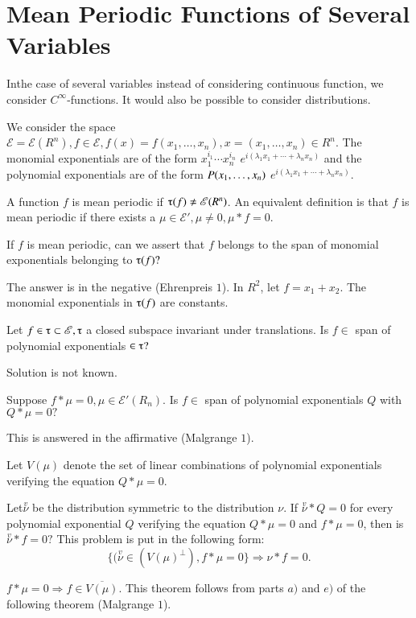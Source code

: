 \chapter{Mean Periodic Functions of Several Variables}\label{chap23}%

In\pageoriginale the case of several variables instead of considering continuous
function, we consider $C^\infty$-functions. It would also be possible
to consider distributions. 

We consider the space $\mathscr{E} = \mathscr{E}(R^n), f \in
\mathscr{E}, f(x) = f(x_1,\ldots, x_n), x = (x_1,\ldots, x_n) \in
R^n$. The monomial exponentials are of the form $x_1^{i_1} \cdots
x_n^{i_n}$ $e^{i (\lambda_1 x_1 + \cdots + \lambda_n x_n)}$ and the
polynomial exponentials are of the form $P(x_1,\ldots,\break x_n)$ 
$e^{i(\lambda_1x_1 + \cdots + \lambda_n x_n)}$. 

A function $f$ is mean periodic if $\tauup(f) \neq
\mathscr{E}(R^n)$. An equivalent definition is that $f$ is mean
periodic if there exists a $\mu \in \mathscr{E}', \mu \neq 0, \mu * f
= 0$. 

\begin{prob}\label{chap23:prob1}%
 If $f$ is mean periodic, can we assert that $f$ belongs to the span
 of monomial exponentials belonging to $\tauup (f)?$ 
\end{prob}

The answer is in the negative (Ehrenpreis $1$). In $R^2$, let $f = x_1
+ x_2$. The monomial exponentials in $\tauup(f)$ are constants. 

\begin{prob}\label{chap23:prob2}%
 Let $f \in \tauup \subset \mathscr{E}, \tauup $ a closed subspace
 invariant under translations. Is $f \in$ span of polynomial
 exponentials $\in \tauup?$ 
\end{prob}

Solution is not known.

\begin{prob}\label{chap23:prob3}%
 Suppose $f * \mu = 0, \mu \in \mathscr{E}'(R_n)$. Is $f \in$ span of
 polynomial exponentials $Q$ with $Q * \mu = 0?$ 
\end{prob}

This is answered in the affirmative (Malgrange $1$).

Let $V(\mu)$ denote the set of linear combinations of polynomial
exponentials verifying the equation $Q * \mu = 0$. 

Let\pageoriginale $\overset{v}{\nu}$ be the distribution symmetric to the
distribution $\nu$. If $\overset{v}{\nu} * Q = 0$ for every polynomial
exponential $Q$ verifying the equation $Q * \mu = 0$ and $f * \mu= 0$,
then is $\overset{v}{\nu} * f = 0?$ This problem is put in the
following form: 
$$
\{(\overset{v}{\nu} \in (V(\mu)^\perp), f* \mu = 0 \} \Rightarrow \nu * f = 0.
$$
\setcounter{theorem}{0}
\begin{theorem}\label{chap23:thm1}%
 $f * \mu = 0 \Rightarrow f \in \overline{V(\mu)}$. This theorem
 follows from parts $a)$ and $e)$ of the following theorem (Malgrange
 $1$). 
\end{theorem}

